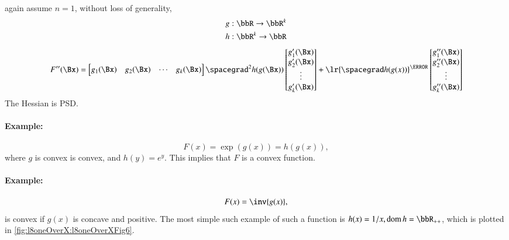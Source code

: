 again assume \( n = 1 \), without loss of generality,
%
\begin{equation}\label{eqn:convexOptimizationLecture8:220}
\begin{aligned}
g &: \bbR \rightarrow \bbR^k \\
h &: \bbR^k \rightarrow \bbR \\
\end{aligned}
\end{equation}
%
\begin{equation}\label{eqn:convexOptimizationLecture8:240}
F''(\Bx)
=
\begin{bmatrix}
g_1(\Bx) & g_2(\Bx) & \cdots & g_k(\Bx)
\end{bmatrix}
\spacegrad^2 h(g(\Bx))
\begin{bmatrix}
g_1'(\Bx) \\ g_2'(\Bx) \\ \vdots \\ g_k'(\Bx)
\end{bmatrix}
+
\lr{ \spacegrad h(g(x)) }^\T
\begin{bmatrix}
g_1''(\Bx) \\ g_2''(\Bx) \\ \vdots \\ g_k''(\Bx)
\end{bmatrix}
\end{equation}
%
The Hessian is PSD.

\paragraph{Example:}
%
\begin{equation}\label{eqn:convexOptimizationLecture8:260}
F(x) = \exp( g(x) ) = h( g(x) ),
\end{equation}
%
where \( g \) is convex is convex, and \( h(y) = e^y \).  This implies that \( F \) is a convex function.

\paragraph{Example:}
%
\begin{equation}\label{eqn:convexOptimizationLecture8:280}
F(x) = \inv{g(x)},
\end{equation}
%
is convex if \( g(x) \) is concave and positive.  The most simple such example of such a function is \( h(x) = 1/x, \dom h = \bbR_{++} \), which is plotted in \cref{fig:l8oneOverX:l8oneOverXFig6}.


